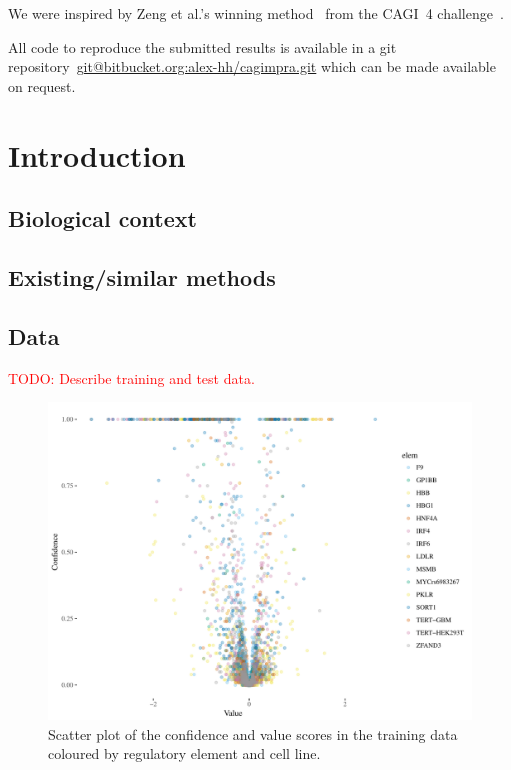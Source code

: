 \documentclass{article}
\newcommand{\todo}[1]{\textcolor{red}{TODO: #1}}
\begin{document}
We were inspired by Zeng et al.'s winning
method~\cite{ZengAccurateeQTLprioritization2017} from the CAGI~4
challenge~\citep{KreimerPredictinggeneexpression2017}.

All code to reproduce the submitted results is available in a git
repository~\url{git@bitbucket.org:alex-hh/cagimpra.git} which can be made
available on request.


\section*{Introduction}

\subsection*{Biological context}


\subsection*{Existing/similar methods}

\subsection*{Data}

\todo{Describe training and test data.}

\begin{figure}
\includegraphics[width=\textwidth]{fig-conf-value-scatter}
\caption{Scatter plot of the confidence and value scores in the training data coloured
by regulatory element and cell line.}
\label{fig:conf-value}
\end{figure}
\end{document}
